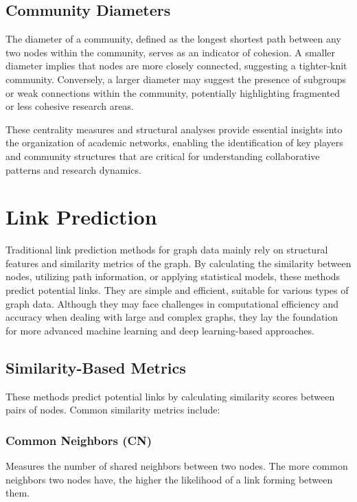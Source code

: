 \documentclass[11pt]{article}
\begin{document}
\subsection{Community Diameters}

The diameter of a community, defined as the longest shortest path between any two nodes within the community, serves as an indicator of cohesion. A smaller diameter implies that nodes are more closely connected, suggesting a tighter-knit community. Conversely, a larger diameter may suggest the presence of subgroups or weak connections within the community, potentially highlighting fragmented or less cohesive research areas.

These centrality measures and structural analyses provide essential insights into the organization of academic networks, enabling the identification of key players and community structures that are critical for understanding collaborative patterns and research dynamics.


\section{Link Prediction}
Traditional link prediction methods for graph data mainly rely on structural features and similarity metrics of the graph. By calculating the similarity between nodes, utilizing path information, or applying statistical models, these methods predict potential links. They are simple and efficient, suitable for various types of graph data. Although they may face challenges in computational efficiency and accuracy when dealing with large and complex graphs, they lay the foundation for more advanced machine learning and deep learning-based approaches.

\subsection{Similarity-Based Metrics}

These methods predict potential links by calculating similarity scores between pairs of nodes. Common similarity metrics include:

\subsubsection{Common Neighbors (CN)}
Measures the number of shared neighbors between two nodes. The more common neighbors two nodes have, the higher the likelihood of a link forming between them.
\end{document}
